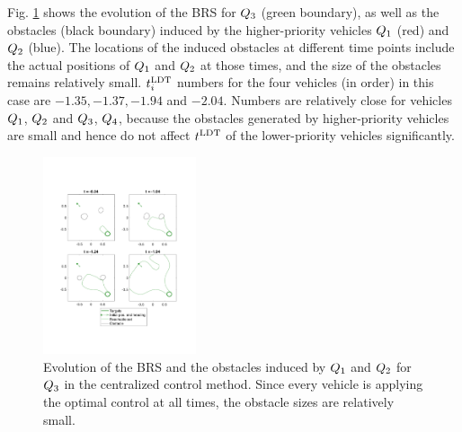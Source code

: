 Fig. \ref{fig:cc_rs3} shows the evolution of the BRS for $Q_3$ (green boundary), as well as the obstacles (black boundary) induced by the higher-priority vehicles $Q_1$ (red) and $Q_2$ (blue). The locations of the induced obstacles at different time points include the actual positions of $Q_1$ and $Q_2$ at those times, and the size of the obstacles remains relatively small. $t^\text{LDT}_i$ numbers for the four vehicles (in order) in this case are $-1.35, -1.37, -1.94$ and $-2.04$. Numbers are relatively close for vehicles $Q_1$, $Q_2$ and $Q_3$, $Q_4$, because the obstacles generated by higher-priority vehicles are small and hence do not affect $t^\text{LDT}$ of the lower-priority vehicles significantly. 

\begin{figure}[H]
  \centering
  \includegraphics[width=0.40\textwidth]{"fig/cc_rs3"}
  \caption{Evolution of the BRS and the obstacles induced by $Q_1$ and $Q_2$ for $Q_3$ in the centralized control method. Since every vehicle is applying the optimal control at all times, the obstacle sizes are relatively small.}
  \label{fig:cc_rs3}
  \vspace{-1.2em}
\end{figure}